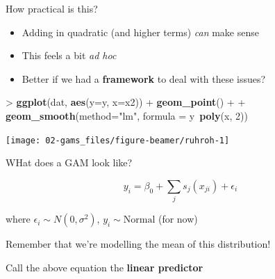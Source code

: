 \documentclass[10pt,ignorenonframetext,compress, aspectratio=169]{beamer}
\newenvironment{Shaded}{\begin{snugshade}}{\end{snugshade}}
\newcommand{\KeywordTok}[1]{\textcolor[rgb]{0.13,0.29,0.53}{\textbf{{#1}}}}
\newcommand{\DataTypeTok}[1]{\textcolor[rgb]{0.13,0.29,0.53}{{#1}}}
\newcommand{\DecValTok}[1]{\textcolor[rgb]{0.00,0.00,0.81}{{#1}}}
\newcommand{\StringTok}[1]{\textcolor[rgb]{0.31,0.60,0.02}{{#1}}}
\newcommand{\NormalTok}[1]{{#1}}
\providecommand{\tightlist}{%
  \setlength{\itemsep}{0pt}\setlength{\parskip}{0pt}}
\begin{document}
\begin{frame}[fragile]{How practical is this?}

\begin{itemize}
\tightlist
\item
  Adding in quadratic (and higher terms) \emph{can} make sense
\item
  This feels a bit \emph{ad hoc}
\item
  Better if we had a \textbf{framework} to deal with these issues?
\end{itemize}

\begin{Shaded}
\begin{Highlighting}[]
\NormalTok{>}\StringTok{ }\KeywordTok{ggplot}\NormalTok{(dat, }\KeywordTok{aes}\NormalTok{(}\DataTypeTok{y=}\NormalTok{y, }\DataTypeTok{x=}\NormalTok{x2)) +}\StringTok{ }\KeywordTok{geom_point}\NormalTok{() +}
\NormalTok{+}\StringTok{     }\KeywordTok{geom_smooth}\NormalTok{(}\DataTypeTok{method=}\StringTok{"lm"}\NormalTok{, }\DataTypeTok{formula =} \NormalTok{y~}\KeywordTok{poly}\NormalTok{(x, }\DecValTok{2}\NormalTok{))}
\end{Highlighting}
\end{Shaded}

\begin{center}\texttt{[image: 02-gams\_files/figure-beamer/ruhroh-1]} \end{center}

\end{frame}

\begin{frame}{WHat does a GAM look like?}

\[
y_i = \beta_0 + \sum_j s_j(x_{ji}) + \epsilon_i
\]

where \(\epsilon_i \sim N(0, \sigma^2)\), \(y_i \sim \text{Normal}\)
(for now)

Remember that we're modelling the mean of this distribution!

Call the above equation the \textbf{linear predictor}

\end{frame}
\end{document}
